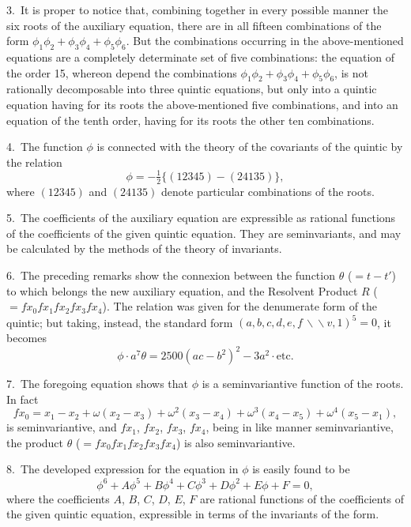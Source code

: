 \documentclass[11pt,a4paper]{book}
\begin{document}
\newpage
\setcounter{page}{322}

3.\ It is proper to notice that, combining together in every possible manner the six roots of the auxiliary equation, there are in all fifteen combinations of the form $\phi_1\phi_2+\phi_3\phi_4+\phi_5\phi_6$. But the combinations occurring in the above-mentioned equations are a completely determinate set of five combinations: the equation of the order 15, whereon depend the combinations $\phi_1\phi_2+\phi_3\phi_4+\phi_5\phi_6$, is not rationally decomposable into three quintic equations, but only into a quintic equation having for its roots the above-mentioned five combinations, and into an equation of the tenth order, having for its roots the other ten combinations.

4.\ The function $\phi$ is connected with the theory of the covariants of the quintic by the relation
\[
\phi = -\tfrac{1}{2}\{(12345)-(24135)\},
\]
where $(12345)$ and $(24135)$ denote particular combinations of the roots.

5.\ The coefficients of the auxiliary equation are expressible as rational functions of the coefficients of the given quintic equation. They are seminvariants, and may be calculated by the methods of the theory of invariants.

\newpage
\setcounter{page}{323}

6.\ The preceding remarks show the connexion between the function $\theta$ ($=t-t'$) to which belongs the new auxiliary equation, and the Resolvent Product $R$ ($=fx_0 fx_1 fx_2 fx_3 fx_4$). The relation was given for the denumerate form of the quintic; but taking, instead, the standard form $(a,b,c,d,e,f\,\backslash\!\!\backslash v, 1)^5=0$, it becomes
\[
\phi\cdot a^7\theta = 2500(ac-b^2)^2 - 3a^2\cdot\text{etc.}
\]

7.\ The foregoing equation shows that $\phi$ is a seminvariantive function of the roots. In fact
\[
fx_0 = x_1-x_2 + \omega(x_2-x_3) + \omega^2(x_3-x_4) + \omega^3(x_4-x_5) + \omega^4(x_5-x_1),
\]
is seminvariantive, and $fx_1$, $fx_2$, $fx_3$, $fx_4$, being in like manner seminvariantive, the product $\theta$ ($=fx_0 fx_1 fx_2 fx_3 fx_4$) is also seminvariantive.

\newpage
\setcounter{page}{324}

8.\ The developed expression for the equation in $\phi$ is easily found to be
\[
\phi^6 + A\phi^5 + B\phi^4 + C\phi^3 + D\phi^2 + E\phi + F = 0,
\]
where the coefficients $A$, $B$, $C$, $D$, $E$, $F$ are rational functions of the coefficients of the given quintic equation, expressible in terms of the invariants of the form.
\end{document}

